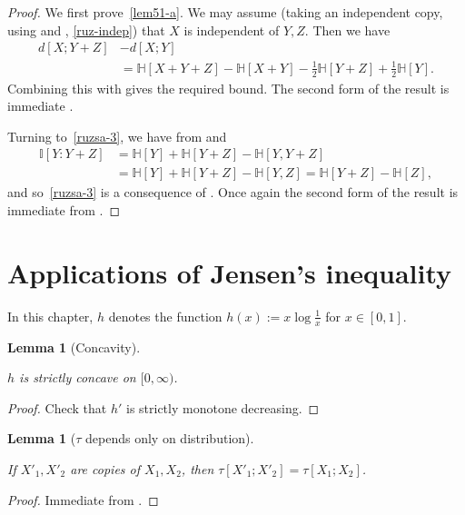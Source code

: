 \documentclass[10pt,a4paper]{article}
\newtheorem{lemma}[theorem]{Lemma}
\newcommand{\lean}[1]{}
\newcommand{\uses}[1]{}
\newcommand{\leanok}{}
\newcommand{\chapter}[1]{\section{#1}}
\newcommand{\bbH}{\mathbb{H}}
\newcommand{\bbI}{\mathbb{I}}
\begin{document}
  \begin{proof}
    \uses{ruz-copy, independent-exist, kv, ruz-indep, relabeled-entropy, cond-dist-fact}\leanok
  We first prove~\eqref{lem51-a}. We may assume (taking an independent copy, using  and , \ref{ruz-indep}) that $X$ is independent of $Y, Z$. Then we have
  \begin{align*}  d[X ;Y+ Z] & - d[X ;Y] \\ & = \bbH[X + Y + Z] - \bbH[X + Y] - \tfrac{1}{2}\bbH[Y + Z] + \tfrac{1}{2} \bbH[Y].\end{align*}
  Combining this with  gives the required bound. The second form of the result is immediate .

  Turning to~\eqref{ruzsa-3}, we have from  and 
  \begin{align*}  \bbI[Y : Y+ Z] & = \bbH[Y] + \bbH[Y + Z] - \bbH[Y, Y + Z] \\ & = \bbH[Y] + \bbH[Y + Z] - \bbH[Y, Z]  = \bbH[Y + Z] - \bbH[Z],\end{align*}
  and so~\eqref{ruzsa-3} is a consequence of . Once again the second form of the result is immediate from .
\end{proof}

\chapter{Applications of Jensen's inequality}

In this chapter, $h$ denotes the function $h(x) := x \log \frac{1}{x}$ for $x \in [0,1]$.

\begin{lemma}[Concavity]\label{concave}
  \lean{Real.strictConcaveOn_negMulLog}\leanok
  $h$ is strictly concave on $[0,\infty)$.
\end{lemma}

\begin{proof} \leanok Check that $h'$ is strictly monotone decreasing.
\end{proof}


\begin{lemma}[$\tau$ depends only on distribution]\label{tau-copy}\leanok
  \uses{tau-def}
  \lean{ProbabilityTheory.IdentDistrib.tau_eq}  If $X'_1, X'_2$ are copies of $X_1,X_2$, then $\tau[X'_1;X'_2] = \tau[X_1;X_2]$.
\end{lemma}


\begin{proof}\uses{copy-ent}\leanok Immediate from .
\end{proof}
\end{document}
